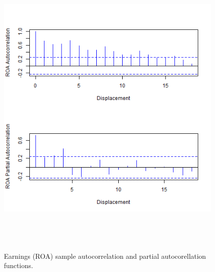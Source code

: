 \begin{figure}[H] 
\centering
\includegraphics[width=5in, height=6in]{figures/roa-acf}
\captionsetup{justification=centering, width=.95\textwidth} 
\caption{\footnotesize Earnings (ROA) sample autocorrelation and partial autocorellation functions.} \label{roa-acf}
\end{figure} 
 \newpage 

